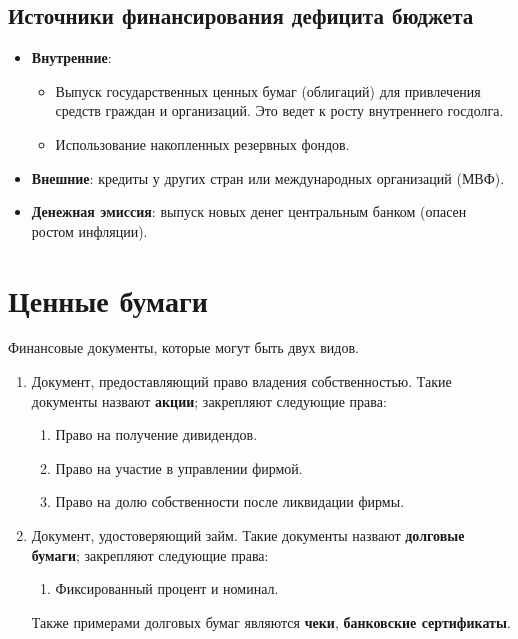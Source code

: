 \documentclass[12pt]{article}
\begin{document}
	\subsection{Источники финансирования дефицита бюджета}
	
	\begin{itemize}
		\item \textbf{Внутренние}:
		\begin{itemize}
			\item Выпуск государственных ценных бумаг (облигаций) для привлечения средств граждан и организаций. Это ведет к росту внутреннего госдолга.
			\item Использование накопленных резервных фондов.
		\end{itemize}
		\item \textbf{Внешние}: кредиты у других стран или международных организаций (МВФ).
		\item \textbf{Денежная эмиссия}: выпуск новых денег центральным банком (опасен ростом инфляции).
	\end{itemize}
	
	\section{Ценные бумаги}
	
	\begin{definition}
		Финансовые документы, которые могут быть двух видов.
		
		\begin{enumerate}
			\item Документ, предоставляющий право владения собственностью. Такие документы назвают \textbf{акции}; закрепляют следующие права:
			\begin{enumerate}
				\item Право на получение дивидендов.
				\item Право на участие в управлении фирмой.
				\item Право на долю собственности после ликвидации фирмы.
			\end{enumerate}
			\item Документ, удостоверяющий займ. Такие документы назвают \textbf{долговые бумаги}; закрепляют следующие права:
			\begin{enumerate}
				\item Фиксированный процент и номинал.
			\end{enumerate}
			Также примерами долговых бумаг являются \textbf{чеки}, \textbf{банковские сертификаты}.
		\end{enumerate}
	\end{definition}
	
\end{document}

